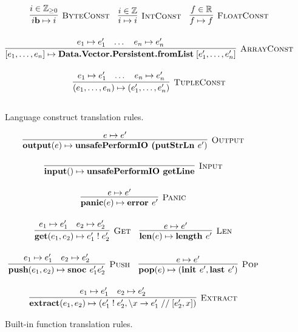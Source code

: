 \documentclass[a4paper,UKenglish,cleveref, autoref, thm-restate]{template/lipics-v2021}
\begin{document}
\begin{figure}
\begin{gather*}
    \infer[\textsc{ByteConst}]%
    {i\textbf{b} \mapsto i}%
    {i \in \mathbb{Z}_{\geq 0}} \quad
    \infer[\textsc{IntConst}]%
    {i \mapsto i}%
    {i \in \mathbb{Z}} \quad
    \infer[\textsc{FloatConst}]%
    {f \mapsto f}%
    {f \in \mathbb{R}} \\[1em]
    \infer[\textsc{ArrayConst}]%
    {[e_1,\dots,e_n] \mapsto \textbf{Data.Vector.Persistent.fromList} \; [e_1',\dots,e_n']}%
    {e_1 \mapsto e_1' & \dots & e_n \mapsto e_n'} \\[1em]
    \infer[\textsc{TupleConst}]%
    {(e_1,\dots,e_n) \mapsto (e_1',\dots,e_n')}%
    {e_1 \mapsto e_1' & \dots & e_n \mapsto e_n'} \\[1em]
  \end{gather*}
  \caption{Language construct translation rules.}
  \label{fig:lang-rules}
\end{figure}

\begin{figure}
  \centering
  \begin{gather*}
    \infer[\textsc{Output}]%
    {\textbf{output} (e) \mapsto \textbf{unsafePerformIO (putStrLn } e' )}%
    {e \mapsto e'} \\[1em]
    \infer[\textsc{Input}]%
    {\textbf{input} () \mapsto \textbf{unsafePerformIO getLine}}%
    {} \\[1em]
    \infer[\textsc{Panic}]%
    {\textbf{panic} (e) \mapsto \textbf{error } e'}%
    {e \mapsto e'} \\[1em]
    \infer[\textsc{Get}]%
    {\textbf{get} (e_1, e_2) \mapsto e_1'\; ! \; e_2'}%
    {e_1 \mapsto e_1' & e_2 \mapsto e_2'} \quad
    \infer[\textsc{Len}]%
    {\textbf{len} (e) \mapsto \textbf{length } e'}%
    {e \mapsto e'} \\[1em]
    \infer[\textsc{Push}]%
    {\textbf{push} (e_1, e_2) \mapsto \textbf{snoc } e_1' e_2'}%
    {e_1 \mapsto e_1' & e_2 \mapsto e_2'} \quad
    \infer[\textsc{Pop}]%
    {\textbf{pop} (e) \mapsto (\textbf{init } e', \textbf{last } e')}%
    {e \mapsto e'} \\[1em]
    \infer[\textsc{Extract}]%
    {\textbf{extract} (e_1, e_2) \mapsto (e_1' \; ! \; e_2', \backslash x \rightarrow e_1' \; // \; [e_2', x])}%
    {e_1 \mapsto e_1' & e_2 \mapsto e_2'}
  \end{gather*}
  \caption{Built-in function translation rules.}
  \label{fig:inbuilt-rules}
\end{figure}
\end{document}
